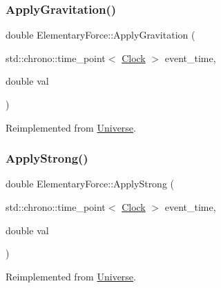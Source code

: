 \subsubsection{\texorpdfstring{Apply\+Gravitation()}{ApplyGravitation()}}
{\footnotesize\ttfamily double Elementary\+Force\+::\+Apply\+Gravitation (\begin{DoxyParamCaption}\item[{std\+::chrono\+::time\+\_\+point$<$ \mbox{\hyperlink{universe_8h_a0ef8d951d1ca5ab3cfaf7ab4c7a6fd80}{Clock}} $>$}]{event\+\_\+time,  }\item[{double}]{val }\end{DoxyParamCaption})\hspace{0.3cm}{\ttfamily [virtual]}}



Reimplemented from \mbox{\hyperlink{classUniverse_a76c0b5e63c2a7d1988c44db341c3d64c}{Universe}}.

\mbox{\label{classElementaryForce_a8a16bff6b5df2b0ff918262bf6376ade}} 
\subsubsection{\texorpdfstring{Apply\+Strong()}{ApplyStrong()}}
{\footnotesize\ttfamily double Elementary\+Force\+::\+Apply\+Strong (\begin{DoxyParamCaption}\item[{std\+::chrono\+::time\+\_\+point$<$ \mbox{\hyperlink{universe_8h_a0ef8d951d1ca5ab3cfaf7ab4c7a6fd80}{Clock}} $>$}]{event\+\_\+time,  }\item[{double}]{val }\end{DoxyParamCaption})\hspace{0.3cm}{\ttfamily [virtual]}}



Reimplemented from \mbox{\hyperlink{classUniverse_a906a88b37f10bfa630bef49dfd0e907a}{Universe}}.

\mbox{\label{classElementaryForce_a80f1977e777aa0c8cce2124b666e6446}} 
